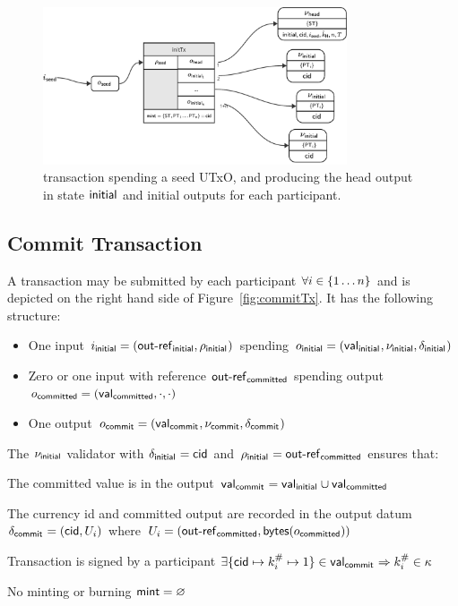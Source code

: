 \begin{figure}[h]
	\centering
	\includegraphics[width=0.8\textwidth]{figures/initTx.pdf}
	\caption{\mtxInit{} transaction spending a seed UTxO, and producing the head
		output in state $\mathsf{initial}$ and initial outputs for each participant.}\label{fig:initTx}
\end{figure}

\subsection{Commit Transaction}\label{sec:commit-tx}

A \mtxCom{} transaction may be submitted by each participant
$\forall i \in \{1 \dots n\}$ and is depicted on the right hand side of
Figure~\ref{fig:commitTx}. It has the following structure:
\begin{itemize}
	\item One input $i_{\mathsf{initial}} = (\mathsf{out\textsf{-}{}ref}_{\mathsf{initial}}, \rho_{\mathsf{initial}_{}})$
	      spending $o_{\mathsf{initial}} = (\mathsf{val}_{\mathsf{initial}_{}}, \nu_{\mathsf{initial}}, \delta_{\mathsf{initial}_{}})$
	\item Zero or one input with reference
	      $\mathsf{out\textsf{-}{}ref}_{\mathsf{committed}}$ spending output
	      $o_{\mathsf{committed}} = (\mathsf{val}_{\mathsf{committed}}, \cdot , \cdot)$
	\item One output $o_{\mathsf{commit}} = (\mathsf{val}_{\mathsf{commit}_{}}, \nu_{\mathsf{commit}}, \delta_{\mathsf{commit}_{}})$
\end{itemize}

\noindent The $\nu_{\mathsf{initial}}$ validator with $\delta_{\mathsf{initial}_{}} = \mathsf{cid}$ and $\rho_{\mathsf{initial}_{}} = \mathsf{out\textsf{-}{}ref}_{\mathsf{committed}}$ ensures that:
\begin{menumerate}
	\item The committed value is in the output $\mathsf{val}_{\mathsf{commit}_{}} = \mathsf{val}_{\mathsf{initial}_{}} \cup \mathsf{val}_{\mathsf{committed}}$
	\item The currency id and committed output are recorded in the output datum
	$\delta_{\mathsf{commit}_{}} = (\mathsf{cid}, U_{i})$ where
	$U_{i} = (\mathsf{out\textsf{-}{}ref}_{\mathsf{committed}},\mathsf{bytes}(o_{\mathsf{committed}}))$
	\item Transaction is signed by a participant $\exists \{\mathsf{cid} \mapsto k^{\#}_{i} \mapsto 1\} \in \mathsf{val}_{\mathsf{commit}_{}} \Rightarrow k^{\#}_{i} \in \kappa$
	\item No minting or burning  $\mathsf{mint} = \varnothing$
\end{menumerate}


